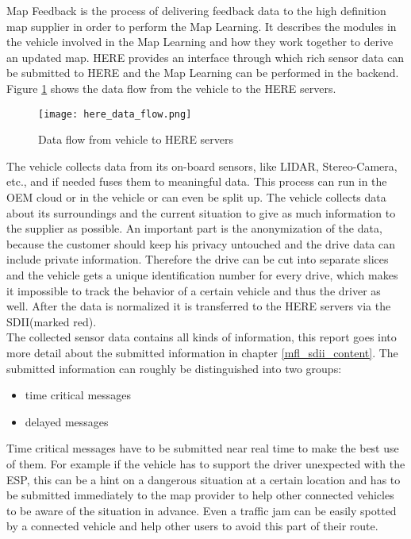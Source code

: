 Map Feedback is the process of delivering feedback data to the high definition map supplier in order to perform the Map Learning. It describes the modules in the vehicle involved in the Map Learning and how they work together to derive an updated map. HERE provides an interface through which rich sensor data can be submitted to HERE and the Map Learning can be performed in the backend. Figure \ref{here_data_flow} shows the data flow from the vehicle to the HERE servers.
\begin{figure}[!hbt]
\texttt{[image: here\_data\_flow.png]}
\caption{Data flow from vehicle to HERE servers\cite{here_sdii}}
\label{here_data_flow}
\end{figure}
The vehicle collects data from its on-board sensors, like LIDAR, Stereo-Camera, etc., and if needed fuses them to meaningful data. This process can run in the \ac{OEM} cloud or in the vehicle or can even be split up. The vehicle collects data about its surroundings and the current situation to give as much information to the supplier as possible. An important part is the anonymization of the data, because the customer should keep his privacy untouched and the drive data can include private information. Therefore the drive can be cut into separate slices and the vehicle gets a unique identification number for every drive, which makes it impossible to track the behavior of a certain vehicle and thus the driver as well. After the data is normalized it is transferred to the HERE servers via the \ac{SDII}(marked red).\\
The collected sensor data contains all kinds of information, this report goes into more detail about the submitted information in chapter \ref{mfl_sdii_content}. The submitted information can roughly be distinguished into two groups:
\begin{itemize}
\item time critical messages
\item delayed messages
\end{itemize}
Time critical messages have to be submitted near real time to make the best use of them. For example if the vehicle has to support the driver unexpected with the \ac{ESP}, this can be a hint on a dangerous situation at a certain location and has to be submitted immediately to the map provider to help other connected vehicles to be aware of the situation in advance. Even a traffic jam can be easily spotted by a connected vehicle and help other users to avoid this part of their route.\\
